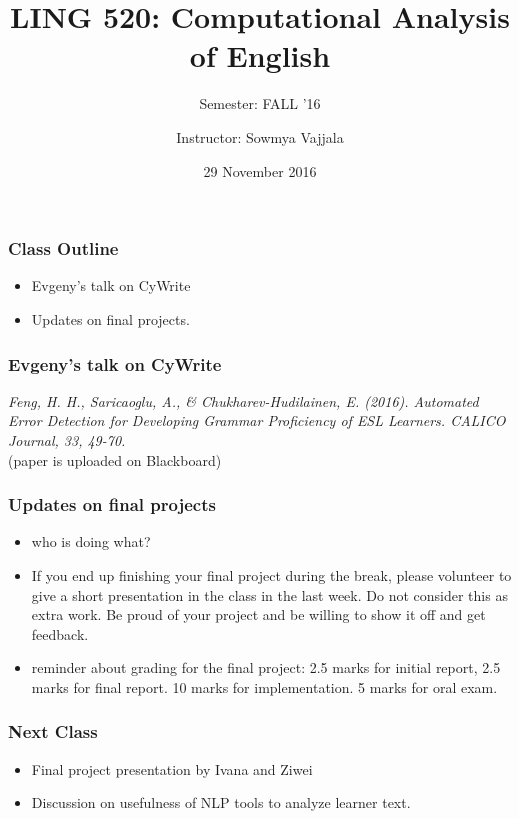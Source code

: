 \documentclass{beamer}
\author[Sowmya Vajjala]{Instructor: Sowmya Vajjala}
\title[LING 520]{LING 520: Computational Analysis of English}
\subtitle{Semester: FALL '16}
\date{29 November 2016}
\institute{Iowa State University, USA}
\begin{document}
\begin{frame}\titlepage
\end{frame}

\begin{frame}
\frametitle{Class Outline}
\begin{itemize}
\item Evgeny's talk on CyWrite %
\item Updates on final projects.
\end{itemize}
\end{frame}

\begin{frame}
\frametitle{Evgeny's talk on CyWrite}
\textit{Feng, H. H., Saricaoglu, A., \& Chukharev-Hudilainen, E. (2016). Automated Error Detection for Developing Grammar Proficiency of ESL Learners. CALICO Journal, 33, 49-70.}
\\ (paper is uploaded on Blackboard) 
\end{frame}

\begin{frame} %
\frametitle{Updates on final projects}
\begin{itemize}
\item who is doing what?
\item If you end up finishing your final project during the break, please volunteer to give a short presentation in the class in the last week. Do not consider this as extra work. Be proud of your project and be willing to show it off and get feedback.
\item reminder about grading for the final project: 2.5 marks for initial report, 2.5 marks for final report. 10 marks for implementation. 5 marks for oral exam. 
\end{itemize}
\end{frame}

\begin{frame}
\frametitle{Next Class}
\begin{itemize}
\item Final project presentation by Ivana and Ziwei
\item Discussion on usefulness of NLP tools to analyze learner text.
\end{itemize}
\end{frame}
\end{document}
